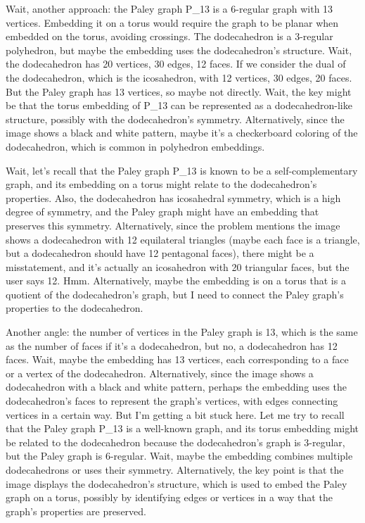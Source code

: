 Wait, another approach: the Paley graph P_13 is a 6-regular graph with 13 vertices. Embedding it on a torus would require the graph to be planar when embedded on the torus, avoiding crossings. The dodecahedron is a 3-regular polyhedron, but maybe the embedding uses the dodecahedron's structure. Wait, the dodecahedron has 20 vertices, 30 edges, 12 faces. If we consider the dual of the dodecahedron, which is the icosahedron, with 12 vertices, 30 edges, 20 faces. But the Paley graph has 13 vertices, so maybe not directly. Wait, the key might be that the torus embedding of P_13 can be represented as a dodecahedron-like structure, possibly with the dodecahedron's symmetry. Alternatively, since the image shows a black and white pattern, maybe it's a checkerboard coloring of the dodecahedron, which is common in polyhedron embeddings. 

Wait, let's recall that the Paley graph P_13 is known to be a self-complementary graph, and its embedding on a torus might relate to the dodecahedron's properties. Also, the dodecahedron has icosahedral symmetry, which is a high degree of symmetry, and the Paley graph might have an embedding that preserves this symmetry. Alternatively, since the problem mentions the image shows a dodecahedron with 12 equilateral triangles (maybe each face is a triangle, but a dodecahedron should have 12 pentagonal faces), there might be a misstatement, and it's actually an icosahedron with 20 triangular faces, but the user says 12. Hmm. Alternatively, maybe the embedding is on a torus that is a quotient of the dodecahedron's graph, but I need to connect the Paley graph's properties to the dodecahedron. 

Another angle: the number of vertices in the Paley graph is 13, which is the same as the number of faces if it's a dodecahedron, but no, a dodecahedron has 12 faces. Wait, maybe the embedding has 13 vertices, each corresponding to a face or a vertex of the dodecahedron. Alternatively, since the image shows a dodecahedron with a black and white pattern, perhaps the embedding uses the dodecahedron's faces to represent the graph's vertices, with edges connecting vertices in a certain way. But I'm getting a bit stuck here. Let me try to recall that the Paley graph P_13 is a well-known graph, and its torus embedding might be related to the dodecahedron because the dodecahedron's graph is 3-regular, but the Paley graph is 6-regular. Wait, maybe the embedding combines multiple dodecahedrons or uses their symmetry. Alternatively, the key point is that the image displays the dodecahedron's structure, which is used to embed the Paley graph on a torus, possibly by identifying edges or vertices in a way that the graph's properties are preserved. 

